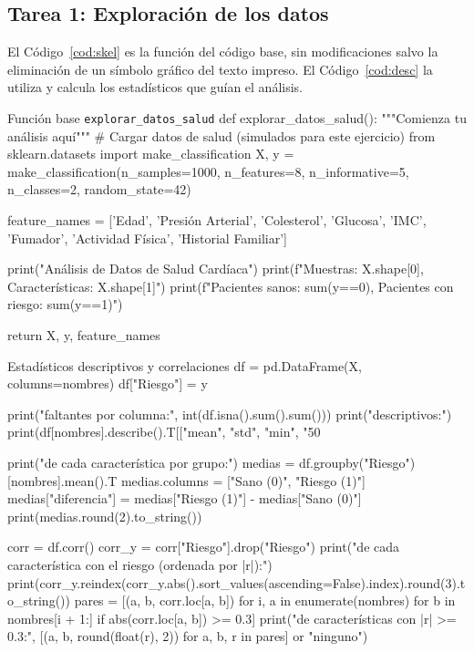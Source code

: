 \documentclass[11pt,letterpaper]{article}
\begin{document}
\subsection{Tarea 1: Exploración de los datos}

El Código~\ref{cod:skel} es la función del código base, sin modificaciones salvo la eliminación de un símbolo gráfico del texto impreso. El Código~\ref{cod:desc} la utiliza y calcula los estadísticos que guían el análisis.

\begin{codigo}[label=cod:skel]{Función base \texttt{explorar\_datos\_salud}}
def explorar_datos_salud():
    """Comienza tu análisis aquí"""
    # Cargar datos de salud (simulados para este ejercicio)
    from sklearn.datasets import make_classification
    X, y = make_classification(n_samples=1000, n_features=8,
                               n_informative=5, n_classes=2,
                               random_state=42)

    feature_names = ['Edad', 'Presión Arterial', 'Colesterol', 'Glucosa',
                     'IMC', 'Fumador', 'Actividad Física', 'Historial Familiar']

    print("Análisis de Datos de Salud Cardíaca")
    print(f"Muestras: {X.shape[0]}, Características: {X.shape[1]}")
    print(f"Pacientes sanos: {sum(y==0)}, Pacientes con riesgo: {sum(y==1)}")

    return X, y, feature_names
\end{codigo}

\begin{codigo}[label=cod:desc]{Estadísticos descriptivos y correlaciones}
df = pd.DataFrame(X, columns=nombres)
df["Riesgo"] = y

print("\nValores faltantes por columna:", int(df.isna().sum().sum()))
print(" descriptivos:")
print(df[nombres].describe().T[["mean", "std", "min", "50%

print("\nMedia de cada característica por grupo:")
medias = df.groupby("Riesgo")[nombres].mean().T
medias.columns = ["Sano (0)", "Riesgo (1)"]
medias["diferencia"] = medias["Riesgo (1)"] - medias["Sano (0)"]
print(medias.round(2).to_string())

corr = df.corr()
corr_y = corr["Riesgo"].drop("Riesgo")
print(" de cada característica con el riesgo (ordenada por |r|):")
print(corr_y.reindex(corr_y.abs().sort_values(ascending=False).index).round(3).to_string())
pares = [(a, b, corr.loc[a, b]) for i, a in enumerate(nombres) for b in nombres[i + 1:] if abs(corr.loc[a, b]) >= 0.3]
print("\nPares de características con |r| >= 0.3:", [(a, b, round(float(r), 2)) for a, b, r in pares] or "ninguno")
\end{codigo}
\end{document}
